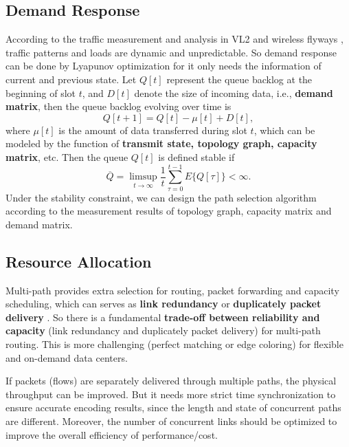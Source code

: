 \documentclass[journal,onecolumn,11pt]{IEEEtran}
\begin{document}
\subsection{Demand Response}

According to the traffic measurement and analysis in VL2 \cite{Greenberg:2009:VSF:1592568.1592576} and wireless flyways \cite{Halperin:2011:ADC:2018436.2018442}, traffic patterns and loads are dynamic and unpredictable. So demand response can be done by Lyapunov optimization for it only needs the information of current and previous state. Let $Q[t]$ represent the queue backlog at the beginning of slot $t$, and $D[t]$ denote the size of incoming data, i.e., \textbf{demand matrix}, then the queue backlog evolving over time is
\begin{equation}
 Q[t+1]=Q[t]-\mu[t]+D[t],
 \label{queue}
\end{equation}
where $\mu[t]$ is the amount of data transferred during slot $t$, which can be modeled by the function of \textbf{transmit state, topology graph, capacity matrix}, etc. Then the queue $Q[t]$ is defined stable if
\begin{equation}
 \overline{Q}=\limsup_{t\rightarrow\infty}\frac{1}{t}\sum_{\tau=0}^{t-1}E\{Q[\tau]\}<\infty.
 \label{stable}
\end{equation}
Under the stability constraint, we can design the path selection algorithm according to the measurement results of topology graph, capacity matrix and demand matrix.

\subsection{Resource Allocation}

Multi-path provides extra selection for routing, packet forwarding and capacity scheduling, which can serves as \textbf{link redundancy} \cite{Wu:2012:NAD:2342356.2342438} or \textbf{duplicately packet delivery} \cite{Guo:2009:BHP:1592568.1592577}. So there is a fundamental \textbf{trade-off between reliability and capacity} (link redundancy and duplicately packet delivery) for multi-path routing. This is more challenging (perfect matching or edge coloring) for flexible and on-demand data centers.

If packets (flows) are separately delivered through multiple paths, the physical throughput can be improved. But it needs more strict time synchronization to ensure accurate encoding results, since the length and state of concurrent paths are different. Moreover, the number of concurrent links should be optimized to improve the overall efficiency of performance/cost.
\end{document}
